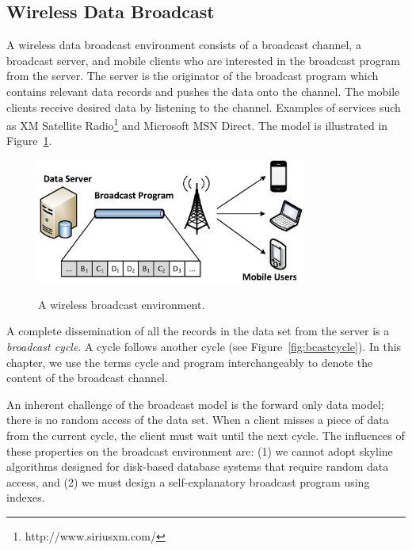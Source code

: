 \subsection{Wireless Data Broadcast}\label{sec:wireless_broadcast}

A wireless data broadcast environment consists of a broadcast
channel, a broadcast server, and mobile clients who are interested
in the broadcast program from the server. The server is the
originator of the broadcast program which contains relevant data
records and pushes the data onto the channel. The mobile clients
receive desired data by listening to the channel. Examples of
services such as XM Satellite
Radio\footnote{http://www.siriusxm.com/} and Microsoft MSN Direct.
The model is illustrated in Figure~\ref{fig:broadcast}.

\begin{figure}[!h]
\begin{center}
\includegraphics[width=3.5in]{Figures/on_demand.eps}
\vspace*{-5pt} \caption{A wireless broadcast environment.}
\vspace*{-10pt} \label{fig:broadcast}
\end{center}
\end{figure}

A complete dissemination of all the records in the data set from
the server is a \emph{broadcast cycle}. A cycle follows another
cycle (see Figure~\ref{fig:bcastcycle}). In this chapter, we use the
terms cycle and program interchangeably to denote the content of
the broadcast channel.

An inherent challenge of the broadcast model is the forward only
data model; there is no random access of the data set. When a
client misses a piece of data from the current cycle, the client
must wait until the next cycle. The influences of these properties
on the broadcast environment are: (1) we cannot adopt skyline
algorithms designed for disk-based database systems that require
random data access, and (2) we must design a self-explanatory
broadcast program using indexes.

